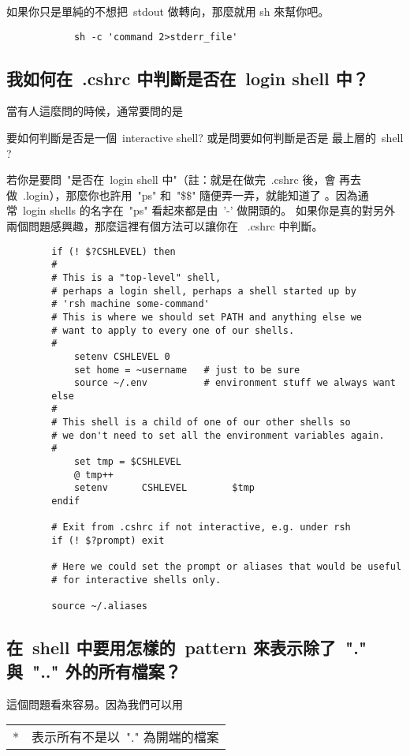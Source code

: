\documentclass{article}
\begin{document}
\begin{CJK*}{Bg5}{ming}
	如果你只是單純的不想把~stdout 做轉向，那麼就用 sh 來幫你吧。
\begin{verbatim}
	        sh -c 'command 2>stderr_file'
\end{verbatim}

\subsection{我如何在~.cshrc 中判斷是否在~login shell 中？}

	當有人這麼問的時候，通常要問的是

	要如何判斷是否是一個~interactive shell? 或是問要如何判斷是否是
        最上層的~shell ?

	若你是要問~"是否在~login shell 中"（註：就是在做完~.cshrc 後，會
	再去做~.login），那麼你也許用~"ps" 和~"\$\$" 隨便弄一弄，就能知道了
	。因為通常~login shells 的名字在~"ps" 看起來都是由~'-' 做開頭的。
	如果你是真的對另外兩個問題感興趣，那麼這裡有個方法可以讓你在 
	~.cshrc 中判斷。
\begin{verbatim}
		if (! $?CSHLEVEL) then
		#
		# This is a "top-level" shell,
		# perhaps a login shell, perhaps a shell started up by
		# 'rsh machine some-command'
		# This is where we should set PATH and anything else we
		# want to apply to every one of our shells.
		#
		    setenv CSHLEVEL 0
		    set home = ~username   # just to be sure
		    source ~/.env          # environment stuff we always want
		else
		#
		# This shell is a child of one of our other shells so
		# we don't need to set all the environment variables again.
		#
		    set tmp = $CSHLEVEL
		    @ tmp++
		    setenv      CSHLEVEL        $tmp
		endif

		# Exit from .cshrc if not interactive, e.g. under rsh
		if (! $?prompt) exit

		# Here we could set the prompt or aliases that would be useful
		# for interactive shells only.

		source ~/.aliases
\end{verbatim}

\subsection{在~shell 中要用怎樣的~pattern 來表示除了~"." 與~".." 
	外的所有檔案？}

	這個問題看來容易。因為我們可以用

\begin{tabular}{l  p{10cm}}
	* &	表示所有不是以~"." 為開端的檔案 \\


\end{tabular}
\end{CJK*}
\end{document}
